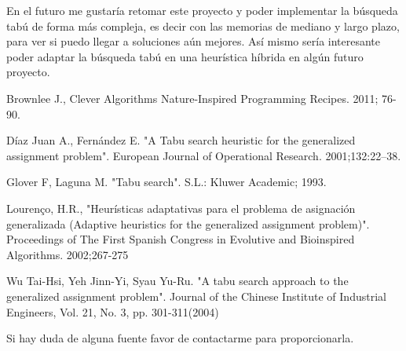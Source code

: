 \documentclass{article}
\begin{document}
En el futuro me gustaría retomar este proyecto y poder implementar la búsqueda tabú de forma más compleja, es decir con las memorias de mediano y largo plazo, para ver si puedo llegar a soluciones aún mejores. Así mismo sería interesante poder adaptar la búsqueda tabú en una heurística híbrida en algún futuro proyecto.

\begin{thebibliography}{9}
	Brownlee J., Clever Algorithms Nature-Inspired Programming Recipes. 2011; 76-90.
	
	Díaz Juan A., Fernández E. "A Tabu search heuristic for the generalized assignment problem". European Journal of Operational Research. 2001;132:22–38.
	  
	Glover F, Laguna M. "Tabu search". S.L.: Kluwer Academic; 1993.  
	
	Lourenço, H.R., "Heurísticas adaptativas para el problema de
	asignación generalizada (Adaptive heuristics for the generalized assignment problem)". Proceedings of The First Spanish Congress in Evolutive and Bioinspired Algorithms. 2002;267-275
	
	Wu Tai-Hsi, Yeh Jinn-Yi, Syau Yu-Ru. "A tabu search approach to the generalized assignment problem". Journal of the Chinese Institute of Industrial Engineers, Vol. 21, No. 3, pp. 301-311(2004)
	
	
\end{thebibliography}

Si hay duda de alguna fuente favor de contactarme para proporcionarla.
\end{document}
